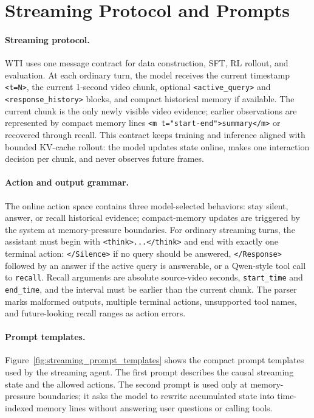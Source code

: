 \appendix



\section{Streaming Protocol and Prompts}
\label{app:protocol_prompts}

\paragraph{Streaming protocol.}
WTI uses one message contract for data construction, SFT, RL rollout, and evaluation.
At each ordinary turn, the model receives the current timestamp \texttt{<t=N>}, the current 1-second video chunk, optional \texttt{<active\_query>} and \texttt{<response\_history>} blocks, and compact historical memory if available.
The current chunk is the only newly visible video evidence; earlier observations are represented by compact memory lines \texttt{<m t="start-end">summary</m>} or recovered through recall.
This contract keeps training and inference aligned with bounded KV-cache rollout: the model updates state online, makes one interaction decision per chunk, and never observes future frames.

\paragraph{Action and output grammar.}
The online action space contains three model-selected behaviors: stay silent, answer, or recall historical evidence; compact-memory updates are triggered by the system at memory-pressure boundaries.
For ordinary streaming turns, the assistant must begin with \texttt{<think>...</think>} and end with exactly one terminal action: \texttt{</Silence>} if no query should be answered, \texttt{</Response>} followed by an answer if the active query is answerable, or a Qwen-style tool call to \texttt{recall}.
Recall arguments are absolute source-video seconds, \texttt{start\_time} and \texttt{end\_time}, and the interval must be earlier than the current chunk.
The parser marks malformed outputs, multiple terminal actions, unsupported tool names, and future-looking recall ranges as action errors.

\paragraph{Prompt templates.}
Figure~\ref{fig:streaming_prompt_templates} shows the compact prompt templates used by the streaming agent.
The first prompt describes the causal streaming state and the allowed actions.
The second prompt is used only at memory-pressure boundaries; it asks the model to rewrite accumulated state into time-indexed memory lines without answering user questions or calling tools.

